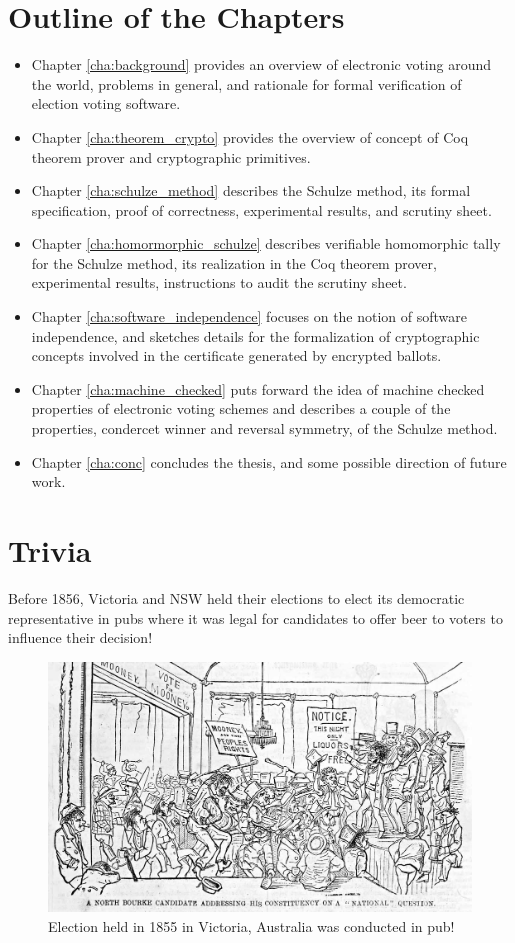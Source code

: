 \section{Outline of the Chapters}
\begin{itemize}

\item Chapter \ref{cha:background} provides an overview of electronic voting around the world, 
problems in general, and rationale for formal verification of election voting software. 
\item Chapter \ref{cha:theorem_crypto} provides the overview of concept of 
Coq theorem prover  and cryptographic primitives.  
\item Chapter \ref{cha:schulze_method} 
describes the Schulze method, its formal specification, proof of correctness, experimental results, 
and scrutiny sheet.  
\item Chapter \ref{cha:homormorphic_schulze} describes 
verifiable homomorphic tally for the Schulze method, its realization in the Coq theorem prover, experimental 
results,  instructions to audit the scrutiny sheet. 
\item Chapter \ref{cha:software_independence} focuses on the notion of software independence, and 
sketches details for the formalization of  cryptographic concepts involved in the 
certificate generated by encrypted ballots. 
\item Chapter \ref{cha:machine_checked} puts forward the idea of 
machine checked properties of electronic voting schemes and describes a couple of the 
properties,  condercet winner and reversal symmetry, of the Schulze method. 
\item Chapter \ref{cha:conc} concludes the thesis, and some possible direction of future work. 
\end{itemize}


\section{Trivia}
 Before 1856, Victoria and NSW held their elections to elect its 
	  democratic representative in pubs where it was legal for 
	  candidates to offer beer to voters to influence their 
	  decision! 
	  
	   \begin{figure}[htb]
	\begin{center}
	\includegraphics[scale=0.25]{NorthBourke.jpg}
	\caption{Election held in 1855 in Victoria, Australia 
	  was conducted in pub!}
	\end{center}
  \end{figure}   
  
